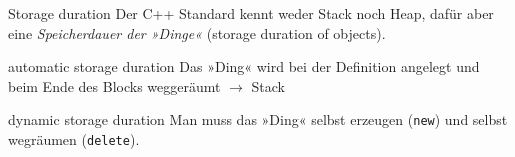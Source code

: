 





\begin{frame}[fragile]{Storage duration}
	Der C++ Standard kennt weder Stack noch Heap, dafür aber eine \emph{Speicherdauer der »Dinge«} (storage duration of objects).
	
	\vspace{1em}
	
	\begin{block}{automatic storage duration}
		Das »Ding« wird bei der Definition angelegt und beim Ende des Blocks weggeräumt $\rightarrow$ Stack
	\end{block}
	
	\vspace{1em}
	
	\begin{block}{dynamic storage duration}
		Man muss das »Ding« selbst erzeugen (\verb|new|) und selbst wegräumen (\verb|delete|).
	\end{block}
\end{frame}

